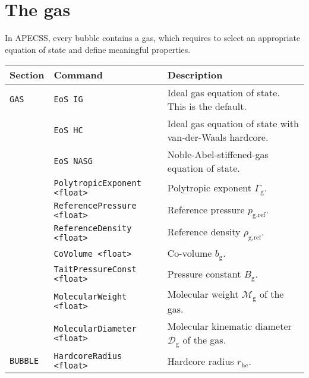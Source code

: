 \section{The gas}
\label{sec:gas}

In APECSS, every bubble contains a gas, which requires to select an appropriate equation of state and define meaningful properties.

\vspace{0.8em}

\noindent
\begin{tabular}{p{} p{} p{}}
    \textbf{Section} &\textbf{Command} & \textbf{Description} 
\vspace{1mm} \\ \hline
{\tt GAS} & {\tt EoS IG} & Ideal gas equation of state. This is the default.\\ 
& {\tt EoS HC} & Ideal gas equation of state with van-der-Waals hardcore.\\ 
& {\tt EoS NASG} & Noble-Abel-stiffened-gas equation of state.\\
& {\tt PolytropicExponent <float>} & Polytropic exponent $\Gamma_\text{g}$.\\
& {\tt ReferencePressure <float>} & Reference pressure $p_\text{g,ref}$.\\
& {\tt ReferenceDensity <float>} & Reference density $\rho_\text{g,ref}$.\\
& {\tt CoVolume <float>} & Co-volume $b_\text{g}$.\\
& {\tt TaitPressureConst <float>} & Pressure constant $B_\text{g}$.\\
& {\tt MolecularWeight <float>} & Molecular weight $\mathcal{M}_{\text{g}}$ of the gas.\\
& {\tt MolecularDiameter <float>} & Molecular kinematic diameter $\mathcal{D}_{\text{g}}$ of the gas.\\
{\tt BUBBLE} & {\tt HardcoreRadius <float>} & Hardcore radius $r_\text{hc}$.\\
 \hline
\end{tabular} \vspace{1em}


